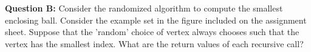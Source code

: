 \documentclass[12pt]{article}
\begin{document}
\noindent
\textbf{Question B:} Consider the randomized algorithm to compute the smallest enclosing ball. Consider the example set in the figure included on the assignment sheet. Suppose that the 'random' choice of vertex always chooses such that the vertex has the smallest index. What are the return values of each recursive call? \smallskip
\end{document}
